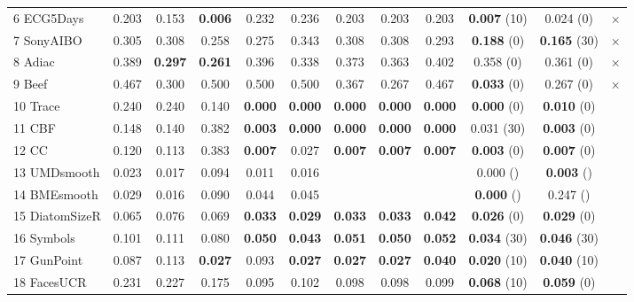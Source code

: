 \begin{table}[h!]
{\begin{tabular}{|l|ccccc|ccc|ccc|}
			6 ECG5Days            & 0.203 & 0.153 & \textbf{0.006} & 0.232 & 0.236    & 0.203 & 0.203 & 0.203 & \textbf{0.007} (10) & 0.024 (0)  & $\times$   \\
			7 SonyAIBO            & 0.305 & 0.308 & 0.258 & 0.275 & 0.343     & 0.308 & 0.308 & 0.293 & \textbf{0.188} (0)  & \textbf{0.165} (30) & $\times$   \\							
			8 Adiac               & 0.389 & \textbf{0.297} & \textbf{0.261} & 0.396 & 0.338     & 0.373 & 0.363 & 0.402 & 0.358 (0)  & 0.361 (0) & $\times$\\
			9 Beef                & 0.467 & 0.300 & 0.500 & 0.500 & 0.500     & 0.367 & 0.267 & 0.467 & \textbf{0.033} (0) & 0.267 (0) & $\times$   \\	
			\hline		
			10 Trace               & 0.240 & 0.240 & 0.140 & \textbf{0.000}    & \textbf{0.000}        & \textbf{0.000} & \textbf{0.000} & \textbf{0.000} & \textbf{0.000} (0)    & \textbf{0.010} (0)  & \checkmark \\	
			11 CBF                 & 0.148 & 0.140 & 0.382 & \textbf{0.003} & \textbf{0.000}        & \textbf{0.000} & \textbf{0.000} & \textbf{0.000} & 0.031 (30) & \textbf{0.003} (0)  & \checkmark \\										
			12 CC                  & 0.120 & 0.113 & 0.383 & \textbf{0.007} & 0.027     & \textbf{0.007} & \textbf{0.007} & \textbf{0.007} &\textbf{0.003} (0) & \textbf{0.007} (0) & \checkmark \\
			13 UMDsmooth 		& 0.023 & 0.017 & 0.094 & 0.011 & 0.016 & & & & 0.000  () & \textbf{0.003} () & \checkmark \\ 
			14 BMEsmooth        & 0.029 & 0.016 & 0.090 & 0.044 & 0.045 & & & & \textbf{0.000} () & 0.247 () 	     & \checkmark \\			
			15 DiatomSizeR     	& 0.065 & 0.076 & 0.069 & \textbf{0.033} & \textbf{0.029}     & \textbf{0.033} & \textbf{0.033} & \textbf{0.042} & \textbf{0.026} (0)  & \textbf{0.029} (0) & \checkmark \\			
			16 Symbols             & 0.101 & 0.111 & 0.080 & \textbf{0.050} & \textbf{0.043}     & \textbf{0.051} & \textbf{0.050} & \textbf{0.052} & \textbf{0.034} (30) & \textbf{0.046} (30) & \checkmark \\
			17 GunPoint            & 0.087 & 0.113 & \textbf{0.027} & 0.093 & \textbf{0.027}     & \textbf{0.027} & \textbf{0.027} & \textbf{0.040} & \textbf{0.020} (10) & \textbf{0.040} (10) & \checkmark \\
			18 FacesUCR            & 0.231 & 0.227 & 0.175 & 0.095 & 0.102     & 0.098 & 0.098 & 0.099 & \textbf{0.068}  (10) & \textbf{0.059} (0) & \checkmark \\

\end{tabular}}
\end{table}
